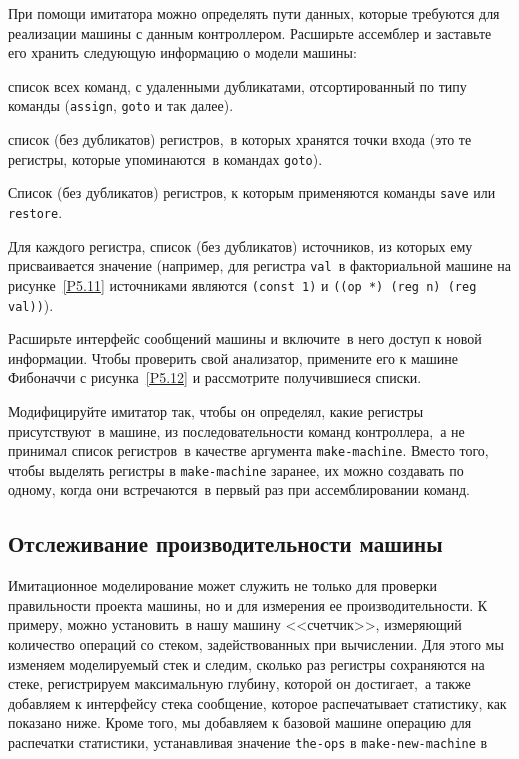 \begin{exercise}{5.12}%
\label{EX5.12}%
При помощи имитатора можно определять пути данных,
которые требуются для реализации машины с данным контроллером.
Расширьте ассемблер и заставьте его хранить следующую информацию о
модели машины:

\begin{plainlist}

\item
список всех команд, с удаленными дубликатами,
отсортированный по типу команды ({\tt assign},
{\tt goto} и так далее).

\item
список (без дубликатов) регистров,~в которых
хранятся точки входа (это те регистры, которые упоминаются~в командах
{\tt goto}).

\item
Список (без дубликатов) регистров, к которым
применяются команды {\tt save} или {\tt restore}.

\item
Для каждого регистра, список (без дубликатов)
источников, из которых ему присваивается значение (например, для
регистра {\tt val}~в факториальной машине на 
рисунке~\ref{P5.11} источниками являются {\tt (const 1)} и
{\tt ((op *) (reg n) (reg val))}).
\end{plainlist}
Расширьте интерфейс сообщений машины и включите~в него доступ к
новой информации.  Чтобы проверить свой анализатор, примените его к
машине Фибоначчи с рисунка~\ref{P5.12} и рассмотрите
получившиеся списки.
\end{exercise}
\begin{exercise}{5.13}%
\label{EX5.13}%
Модифицируйте имитатор так, чтобы он определял, какие
регистры присутствуют~в машине, из последовательности команд
контроллера,~а не принимал список регистров~в качестве аргумента
{\tt make-machine}.  Вместо того, чтобы выделять регистры в
{\tt make-machine} заранее, их можно создавать по одному, когда
они встречаются~в первый раз при ассемблировании команд.
\end{exercise}

\subsection{Отслеживание производительности машины}
\label{MONITORING-MACHINE-PERFORMANCE}

Имитационное моделирование может служить не только для
проверки правильности проекта машины, но и для измерения ее
производительности.  К примеру, можно установить~в нашу машину
<<счетчик>>, измеряющий количество операций со стеком, задействованных
при вычислении. Для этого мы изменяем моделируемый стек и
следим, сколько раз регистры сохраняются на стеке,
регистрируем максимальную
глубину, которой он достигает,~а также добавляем к интерфейсу стека
сообщение, которое распечатывает статистику, как показано ниже.  Кроме
того, мы добавляем к базовой машине операцию для распечатки
статистики, устанавливая значение {\tt the-ops} в
{\tt make-new-machine} в

